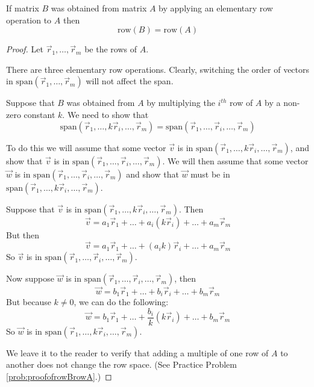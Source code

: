 \documentclass{ximera}
\begin{document}
\begin{theorem}\label{th:rowBrowA} If matrix $B$ was obtained from matrix $A$ by applying an elementary row operation to $A$ then
$$\mbox{row}(B)=\mbox{row}(A)$$
\end{theorem}
\begin{proof}
Let $\vec{r}_1,\ldots ,\vec{r}_m$ be the rows of $A$. 

There are three elementary row operations.  Clearly, switching the order of vectors in $\mbox{span}(\vec{r}_1,\ldots  ,\vec{r}_m)$ will not affect the span.  

Suppose that $B$ was obtained from $A$ by multiplying the $i^{th}$ row of $A$ by a non-zero constant $k$.  We need to show that 
$$\mbox{span}(\vec{r}_1,\ldots ,k\vec{r}_i,\ldots ,\vec{r}_m)=\mbox{span}(\vec{r}_1,\ldots ,\vec{r}_i,\ldots ,\vec{r}_m)$$

To do this we will assume that some vector $\vec{v}$ is in $\mbox{span}(\vec{r}_1,\ldots ,k\vec{r}_i,\ldots ,\vec{r}_m)$, and show that $\vec{v}$ is in $\mbox{span}(\vec{r}_1,\ldots ,\vec{r}_i,\ldots ,\vec{r}_m)$.  We will then assume that some vector $\vec{w}$ is in $\mbox{span}(\vec{r}_1,\ldots ,\vec{r}_i,\ldots ,\vec{r}_m)$ and show that $\vec{w}$ must be in $\mbox{span}(\vec{r}_1,\ldots ,k\vec{r}_i,\ldots ,\vec{r}_m)$.

Suppose that $\vec{v}$ is in $\mbox{span}(\vec{r}_1,\ldots ,k\vec{r}_i,\ldots ,\vec{r}_m)$.  Then 
$$\vec{v}=a_1\vec{r}_1+\ldots +a_i(k\vec{r}_i)+\ldots +a_m\vec{r}_m$$
But then 
$$\vec{v}=a_1\vec{r}_1+\ldots +(a_ik)\vec{r}_i+\ldots +a_m\vec{r}_m$$
So $\vec{v}$ is in $\mbox{span}(\vec{r}_1,\ldots ,\vec{r}_i,\ldots ,\vec{r}_m)$.

Now suppose $\vec{w}$ is in $\mbox{span}(\vec{r}_1,\ldots ,\vec{r}_i,\ldots ,\vec{r}_m)$, then
$$\vec{w}=b_1\vec{r}_1+\ldots +b_i\vec{r}_i+\ldots +b_m\vec{r}_m$$
But because $k\neq 0$, we can do the following:
$$\vec{w}=b_1\vec{r}_1+\ldots +\frac{b_i}{k}(k\vec{r}_i)+\ldots +b_m\vec{r}_m$$
So $\vec{w}$ is in $\mbox{span}(\vec{r}_1,\ldots ,k\vec{r}_i,\ldots ,\vec{r}_m)$.
  
We leave it to the reader to verify that adding a multiple of one row of $A$ to another does not change the row space.  (See Practice Problem \ref{prob:proofofrowBrowA}.)  
  

\end{proof}
\end{document}
